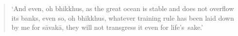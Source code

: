 \clearpage
\thispagestyle{empty}

\mbox{}
\vfill

\begin{quote}
`And even, oh bhikkhus, as the great ocean
is stable and does not overflow its banks,
even so, oh bhikkhus, whatever training
rule has been laid down by me for sāvakā,
they will not transgress it even for life's~sake.'

\end{quote}

\vfill
\mbox{}

